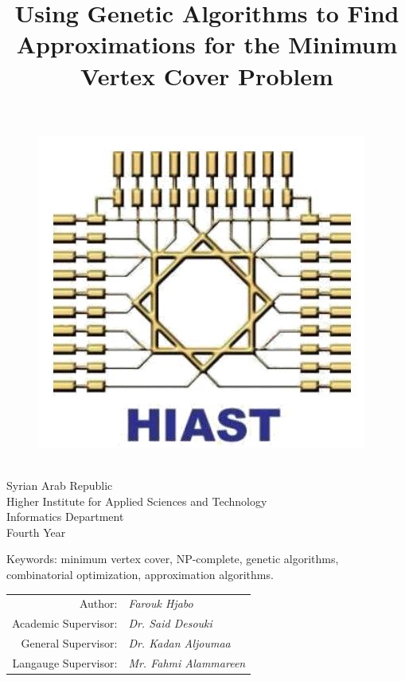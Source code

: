 \documentclass[12pt]{article}
\title{Using Genetic Algorithms to Find Approximations for the Minimum Vertex Cover Problem}
\author{}
\date{}
\newcommand{\lineSeparationLength}{2mm}
\begin{document}

{
\begin{figure}
\hfill
\includegraphics[width=0.9\linewidth]{hiast}
\end{figure}

\ \\[\lineSeparationLength]
Syrian Arab Republic \\[\lineSeparationLength]
Higher Institute for Applied Sciences and Technology \\[\lineSeparationLength]
Informatics Department \\[\lineSeparationLength]
Fourth Year
}

\vspace{25mm}
{\let\newpage\relax\maketitle}

\vspace{-10mm}
\begin{center}
Keywords: minimum vertex cover, NP-complete, genetic algorithms,\\
combinatorial optimization, approximation algorithms.
\end{center}

\vspace{5mm}
\begin{center}
\begin{onehalfspacing}

\begin{tabular}{r l}
Author:					&	\textit{Farouk Hjabo} \\
Academic Supervisor:	&	\textit{Dr. Said Desouki} \\
General Supervisor:		&	\textit{Dr. Kadan Aljoumaa} \\
Langauge Supervisor:	&	\textit{Mr. Fahmi Alammareen} \\
\end{tabular}

\end{onehalfspacing}
\end{center}
\end{document}
